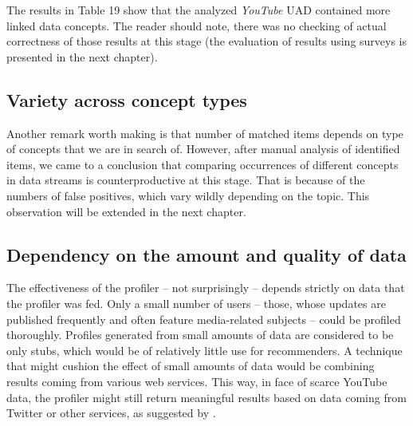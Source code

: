 The results in Table 19 show that the analyzed \textit{YouTube} UAD contained more linked
data concepts. The reader should note, there was no checking of actual correctness of those results at
this stage (the evaluation of results using surveys   is presented in the next chapter).

\subsection{Variety across concept types}
Another remark worth making is that number of matched items depends on type of
concepts that we are in search of. However, after manual analysis of identified
items, we came to a conclusion that comparing occurrences of
different concepts in data streams is counterproductive at this stage.
That is because of the numbers of false positives, which vary wildly
depending on the topic. This observation will be extended in the next chapter.

\subsection{Dependency on the amount and quality of data}

The effectiveness of the profiler -- not surprisingly -- depends strictly on data
that the profiler was fed. Only a small number of users -- those, whose updates
are published frequently and often feature media-related subjects -- could be
profiled thoroughly. Profiles generated from small amounts of data are considered
to be only stubs, which would be of relatively little use for recommenders. A technique that
might cushion the effect of small amounts of data would be combining results
coming from various web services. This way, in face of scarce YouTube data, the
profiler might still return meaningful results based on data coming from
Twitter or other services, as suggested by \cite{public-profiles}.
